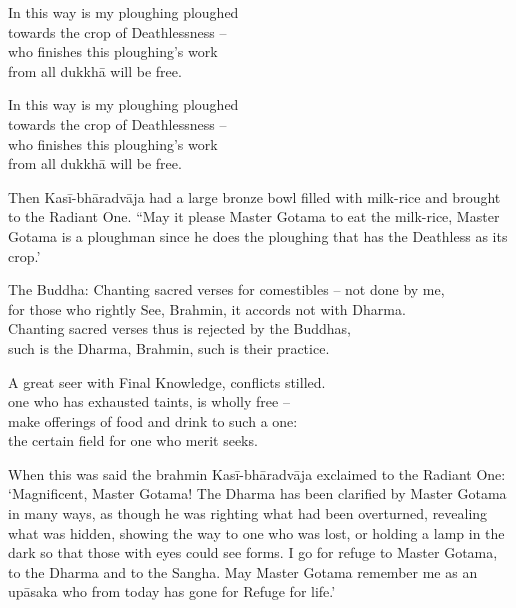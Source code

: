    
\begin{MyDescription}{}
In this way is my ploughing ploughed\\
towards the crop of Deathlessness – \\
who finishes this ploughing's work\\
from all dukkh\=a will be free.
\end{MyDescription}
   
\begin{MyDescription}{}
In this way is my ploughing ploughed\\
towards the crop of Deathlessness – \\
who finishes this ploughing's work\\
from all dukkh\=a will be free.
\end{MyDescription}
   
Then Kasī-bh\=aradv\=aja had a large bronze bowl filled with milk-rice and brought to the Radiant One. “May it please Master Gotama to eat the milk-rice, Master Gotama is a ploughman since he does the ploughing that has the Deathless as its crop.'
   
\begin{MyDescription}{The Buddha:}
Chanting sacred verses for comestibles – not done by me,\\
for those who rightly See, Brahmin, it accords not with Dharma.\\
Chanting sacred verses thus is rejected by the Buddhas,\\
such is the Dharma, Brahmin, such is their practice.
\end{MyDescription}

\begin{MyDescription}{}
A great seer with Final Knowledge, conflicts stilled.\\
one who has exhausted taints, is wholly free – \\
make offerings of food and drink to such a one:\\
the certain field for one who merit seeks.
\end{MyDescription}
   
When this was said the brahmin Kasī-bh\=aradv\=aja exclaimed to the Radiant One: `Magnificent, Master Gotama! The Dharma has been clarified by Master Gotama in many ways, as though he was righting what had been overturned, revealing what was hidden, showing the way to one who was lost, or holding a lamp in the dark so that those with eyes could see forms. I go for refuge to Master Gotama, to the Dharma and to the Sangha. May Master Gotama remember me as an up\=asaka who from today has gone for Refuge for life.'

